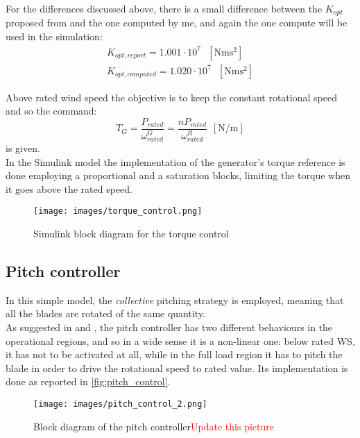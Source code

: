  For the differences discussed above, there is a small difference between the $K_{opt}$ proposed from \cite{DTU_Wind_Energy_Report-I-0092} and the one computed by me, and again the one compute will be used in the simulation:
 \begin{gather*}
     K_{opt, report} = 1.001 \cdot 10^7 \ \ \ \left[\si{\newton\meter\square\second}\right] \\
     K_{opt, computed} = 1.020 \cdot 10^7 \ \ \ \left[\si{\newton\meter\square\second}\right] 
 \end{gather*}

Above rated wind speed the objective is to keep the constant rotational speed and so the command:
\begin{equation}
    T_G = \frac{P_{rated}}{\omega_{rated}^G} = \frac{nP_{rated}}{\omega_{rated}^R}\ \ \left[\si{\newton\per\meter}\right]
    \label{eq:T_G3}
\end{equation}
is given.\\
In the Simulink model the implementation of the generator's torque reference is done employing a proportional and a saturation blocks, limiting the torque when it goes above the rated speed.
\begin{figure}[htb]
    \centering
    \texttt{[image: images/torque\_control.png]}
    \caption{Simulink block diagram for the torque control}
    \label{fig:torque_control}
\end{figure}

\subsection{Pitch controller}
In this simple model, the \textit{collective} pitching strategy is employed, meaning that all the blades are rotated of the same quantity.\\
As suggested in \cite{Aerodynamics_of_wind_turbines} and \cite{SMILDEN2016386}, the pitch controller has two different behaviours in the operational regions, and so in a wide sense it is a non-linear one: below rated \acrshort{WS}, it has not to be activated at all, while in the full load region it has to pitch the blade in order to drive the rotational speed to rated value. Its implementation is done as reported in \autoref{fig:pitch_control}.
\begin{figure}[htb]
    \centering
    \texttt{[image: images/pitch\_control\_2.png]}
    \caption{Block diagram of the pitch controller\textcolor{red}{Update this picture}}
    \label{fig:pitch_control}
\end{figure}


